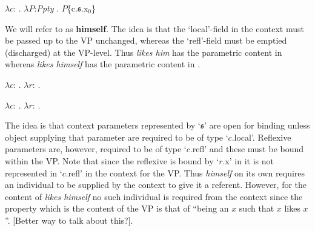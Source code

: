 \begin{ex} 
$\lambda
c$:
 . 
$\lambda P$:\textit{Ppty} . $P$\{c.$\mathfrak{s}$.x$_0$\}
\end{ex} 
We will refer to \preveg{} as \textbf{himself}.  The idea is that the `local'-field in the context must be passed up to
the VP unchanged, whereas the `refl'-field must be emptied
(discharged) at the VP-level.  Thus \textit{likes him} has the
parametric content in  whereas \textit{likes himself} has
the parametric content in .
\begin{ex} 
\begin{subex} 
 
\item $\lambda
c$: . 
$\lambda r$: .  
 
\item $\lambda
c$: . 
$\lambda r$: . 
 
 
\end{subex} 
   
\end{ex}
The idea is that context parameters represented by `$\mathfrak{s}$'
are open for binding unless object supplying that parameter are
required to be of type `$c$.local'.  Reflexive parameters are, however,
required to be of type `$c$.refl' and these must be bound within the VP.
Note that since the reflexive is bound by `$r$.x' in  it is
not represented in `$c$.refl' in the context for the VP.  Thus
\textit{himself} on its own requires an individual to be supplied by
the context to give it a referent.  However, for the content of
\textit{likes himself} no such individual is required from the context
since the property which is the content of the VP is that of ``being
an $x$ such that $x$ likes $x$''.  [Better way to talk about this?].

